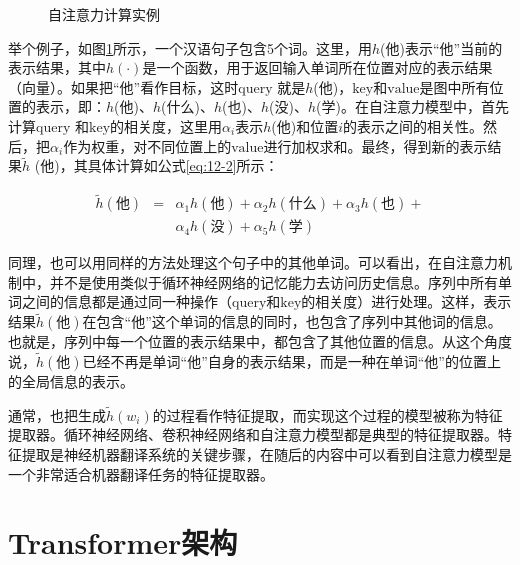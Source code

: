 \begin{figure}[htp]
\centering

\caption{自注意力计算实例}
\label{fig:12-3}
\end{figure}

\parinterval 举个例子，如图\ref{fig:12-3}所示，一个汉语句子包含5个词。这里，用$h$(他)表示“他”当前的表示结果，其中$h(\cdot)$是一个函数，用于返回输入单词所在位置对应的表示结果（向量）。如果把“他”看作目标，这时$\mathrm{query}$ 就是$h$(他)，$\mathrm{key}$和$\mathrm{value}$是图中所有位置的表示，即：{$h$(他)、$h$(什么)、$h$(也)、$h$(没)、$h$(学)}。在自注意力模型中，首先计算$\mathrm{query}$ 和$\mathrm{key}$的相关度，这里用$\alpha_i$表示$h$(他)和位置$i$的表示之间的相关性。然后，把$\alpha_i$作为权重，对不同位置上的$\mathrm{value}$进行加权求和。最终，得到新的表示结果$\tilde{h}$ (他)，其具体计算如公式\eqref{eq:12-2}所示：

\begin{eqnarray}
\tilde{h} (\textrm{他} ) & = & \alpha_1 {h} (\textrm{他} ) + \alpha_2 {h} (\textrm{什么}) + \alpha_3 {h} (\textrm{也} ) + \nonumber \\
                         &   & \alpha_4 {h} (\textrm{没} ) +\alpha_5 {h} (\textrm{学} )
\label{eq:12-2}
\end{eqnarray}


\parinterval 同理，也可以用同样的方法处理这个句子中的其他单词。可以看出，在自注意力机制中，并不是使用类似于循环神经网络的记忆能力去访问历史信息。序列中所有单词之间的信息都是通过同一种操作（$\mathrm{query}$和$\mathrm{key}$的相关度）进行处理。这样，表示结果$\tilde{h} (\textrm{他})$在包含“他”这个单词的信息的同时，也包含了序列中其他词的信息。也就是，序列中每一个位置的表示结果中，都包含了其他位置的信息。从这个角度说，$\tilde{h} (\textrm{他})$已经不再是单词“他”自身的表示结果，而是一种在单词“他”的位置上的全局信息的表示。

\parinterval 通常，也把生成$\tilde{h}(w_i)$的过程看作特征提取，而实现这个过程的模型被称为特征提取器。循环神经网络、卷积神经网络和自注意力模型都是典型的特征提取器。特征提取是神经机器翻译系统的关键步骤，在随后的内容中可以看到自注意力模型是一个非常适合机器翻译任务的特征提取器。

\sectionnewpage
\section{Transformer架构}

